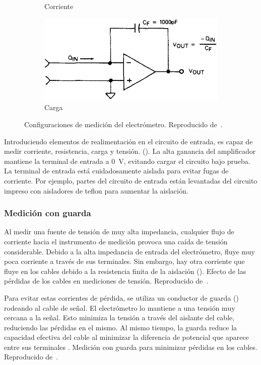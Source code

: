 \begin{figure}[p]
\begin{subfigure}[b]{\textwidth}
        \caption{Corriente}
    \end{subfigure}
    \begin{subfigure}[b]{\textwidth}
    \centering
        \includegraphics{figuras/instrumental/617coulombs.png}
        \caption{Carga}
    \end{subfigure}
    \caption{Configuraciones de medición del electrómetro.
    Reproducido de~\cite{keithley_instruments_inc._keithley_1984}.}
    \label{fig:keithley617}
\end{figure}
Introduciendo elementos de realimentación en el circuito de entrada,
es capaz de medir corriente, resistencia, carga y tensión.
().
La alta ganancia del amplificador mantiene la terminal de entrada a
\SI{0}{\volt}, 
evitando cargar el circuito bajo prueba.
La terminal de entrada está cuidadosamente aislada 
para evitar fugas de corriente. 
Por ejemplo, partes del circuito de entrada 
están levantadas del circuito impreso con aisladores de teflon
para aumentar la aislación.
\subsubsection{Medición con guarda}
Al medir una fuente de tensión de muy alta impedancia,
cualquier flujo de corriente hacia el instrumento de medición
provoca una caída de tensión considerable.
Debido a la alta impedancia de entrada del electrómetro,
fluye muy poca corriente a través de sus terminales.
Sin embargo, hay otra corriente que fluye en los cables debido a la resistencia
finita de la aislación ().
{Efecto de las pérdidas de los cables en mediciones de tensión.
    Reproducido de~\cite{keithley_instruments_inc._keithley_1984}.}

Para evitar estas corrientes de pérdida,
se utiliza un conductor de guarda ()
rodeando al cable de señal.
El electrómetro lo mantiene a una tensión muy cercana a la señal.
Esto minimiza la tensión a través del aislante del cable,
reduciendo las pérdidas en el mismo.
Al mismo tiempo, la guarda reduce la capacidad efectiva del cable
al minimizar la diferencia de potencial que aparece entre sus terminales
\cite{rich_shielding_1983}.
{Medición con guarda para minimizar pérdidas en los cables.
    Reproducido de~\cite{keithley_instruments_inc._keithley_1984}.}
